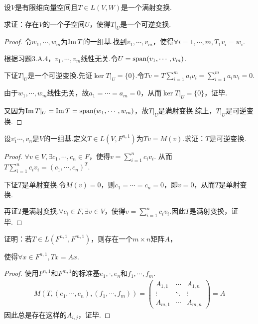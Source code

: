\newpage

\begin{problem}[8]\label{3.D.8}
    设\(V\)是有限维向量空间且\(T \in L(V,W)\)是一个满射变换.

    求证：存在\(V\)的一个子空间\(U\)，使得\(T|_U\)是一个可逆变换.    
\end{problem}

\begin{proof}
    令\(w_1,\cdots,w_m\)为\(\operatorname{Im} T\)的一组基.找到\(v_1,\cdots,v_m\)，使得\(\forall i=1,\cdots,m,T_1v_i=w_i\).

    根据习题3.A.4，\(v_1,\cdots,v_m\)线性无关.令\(U=\operatorname{span} (v_1,\cdots,v_m)\).%
    
    下证\(T|_U\)是一个可逆变换.先证\(\ker T|_U=\{0\}\).令\(Tv=T\sum_{i=1}^m a_iv_i=\sum_{i=1}^m a_iw_i=0\).
    
    由于\(w_1,\cdots,w_m\)线性无关，故\(a_1=\cdots=a_m=0\)，从而\(\ker T|_U=\{0\}\)，证毕.
    
    又因为\(\operatorname{Im} T|_U=\operatorname{Im} T=\operatorname{span} (w_1,\cdots,w_m)\)，故\(T|_U\)是满射变换.综上，\(T|_U\)是可逆变换.
\end{proof}

\begin{problem}[14]
    设\(v_1^,\cdots,v_n\)是\(V\)的一组基.定义\(T \in L(V,F^{n,1})\)为\(Tv=M(v)\).求证：\(T\)是可逆变换.    
\end{problem}

\begin{proof}
    \(\forall v \in V,\exists c_1,\cdots,c_n \in F\)，使得\(v=\sum_{i=1}^n c_iv_i\).
    从而\(T\sum_{i=1}^n c_iv_i=(c_1,\cdots,c_n)^T\).

    下证\(T\)是单射变换.令\(M(v)=0\)，则\(c_1=\cdots=c_n=0\)，即\(v=0\)，从而\(T\)是单射变换.

    再证\(T\)是满射变换.\(\forall c_i \in F,\exists v \in V\)，使得\(v=\sum_{i=1}^n c_iv_i\).因此\(T\)是满射变换，证毕.
\end{proof}

\begin{problem}[15]\label{3.D.15}
    证明：若\(T \in L(F^{n,1},F^{m,1})\)，则存在一个\(m \times n\)矩阵\(A\)，
    
    使得\(\forall x \in F^{n,1},Tx=Ax\).
\end{problem}

\begin{proof}
    使用\(F^{n,1}\)和\(F^{m,1}\)的标准基\(e_1,\cdot,e_n\)和\(f_1,\cdots,f_m\).
    \begin{align*}
        M(T,(e_1,\cdots,e_n),(f_1,\cdots,f_m))=
            \begin{pmatrix}
                A_{1,1} & \cdots & A_{1,n}  \\
                \vdots  & \ddots & \vdots   \\
                A_{m,1} & \cdots & A_{m,n}
            \end{pmatrix}
        =A
    \end{align*}
    因此总是存在这样的\(A_{i,j}\)，证毕.
\end{proof}

